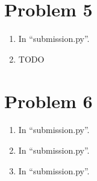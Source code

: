 \documentclass[12pt]{article}
\begin{document}
\section*{Problem 5}

\begin{enumerate}[label=(\alph*)]
  \item In ``submission.py''.
  \item TODO
\end{enumerate}

\section*{Problem 6}
\begin{enumerate}[label=(\alph*)]
  \item In ``submission.py''.
  \item In ``submission.py''.
  \item In ``submission.py''.
\end{enumerate}
\end{document}
